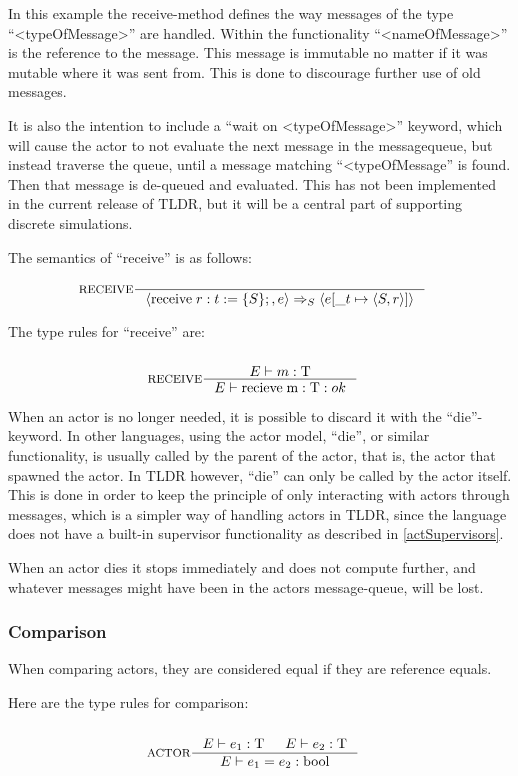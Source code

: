 In this example the receive-method defines the way messages of the type \enquote{<typeOfMessage>} are handled. Within the functionality \enquote{<nameOfMessage>} is the reference to the message. This message is immutable no matter if it was mutable where it was sent from. This is done to discourage further use of old messages.

It is also the intention to include a \enquote{wait on <typeOfMessage>} keyword, which will cause the actor to not evaluate the next message in the messagequeue, but instead traverse the queue, until a message matching \enquote{<typeOfMessage} is found. Then that message is de-queued and evaluated. This has not been implemented in the current release of TLDR, but it will be a central part of supporting discrete simulations.

The semantics of \enquote{receive} is as follows:

\begin{align*}
&\inference[$\text{RECEIVE}$]{}
                           {\Braket{\Treceive r:t := \{S\};,e} \Rightarrow_S \Braket{e[\_t \mapsto \Braket{S,r}]}}
\end{align*}

The type rules for \enquote{receive} are:

\begin{align*}
\intertext{}
&\inference[RECEIVE]{\Tenv m : \Tt}
                 {\Tenv \mathbin{\text{recieve}} \; \mathbin{\text{m}} :\Tt : ok }
\end{align*}

When an actor is no longer needed, it is possible to discard it with the \enquote{die}-keyword. In other languages, using the actor model, \enquote{die}, or similar functionality, is usually called by the parent of the actor, that is, the actor that spawned the actor. In TLDR however, \enquote{die} can only be called by the actor itself. This is done in order to keep the principle of only interacting with actors through messages, which is a simpler way of handling actors in TLDR, since the language does not have a built-in supervisor functionality as described in \cref{actSupervisors}. 

When an actor dies it stops immediately and does not compute further, and whatever messages might have been in the actors message-queue, will be lost.

\subsubsection{Comparison}

When comparing actors, they are considered equal if they are reference equals.

Here are the type rules for comparison:

\begin{align*}
\intertext{}
&\inference[ACTOR]{\Tenv e_1: \Tt & \Tenv e_2: \Tt}
                 {\Tenv e_1 = e_2: \Tbool}                 
\end{align*}
